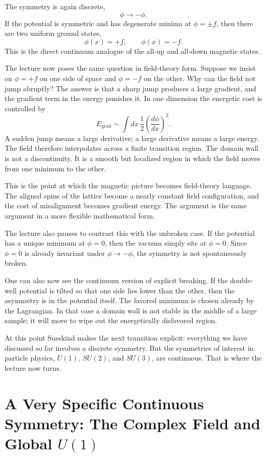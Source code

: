 The symmetry is again discrete,
\[
\phi \longrightarrow -\phi.
\]
If the potential is symmetric and has degenerate minima at \(\phi=\pm f\), then there are two uniform ground states,
\[
\phi(x)=+f,
\qquad
\phi(x)=-f.
\]
This is the direct continuum analogue of the all-up and all-down magnetic states.

The lecture now poses the same question in field-theory form. Suppose we insist on \(\phi=+f\) on one side of space and \(\phi=-f\) on the other. Why can the field not jump abruptly? The answer is that a sharp jump produces a large gradient, and the gradient term in the energy punishes it. In one dimension the energetic cost is controlled by
\begin{equation}
E_{\text{grad}} \sim \int dx\,\frac12\left(\frac{d\phi}{dx}\right)^2.
\label{eq:wall-gradient-energy-refined}
\end{equation}
A sudden jump means a large derivative; a large derivative means a large energy. The field therefore interpolates across a finite transition region. The domain wall is not a discontinuity. It is a smooth but localized region in which the field moves from one minimum to the other.

This is the point at which the magnetic picture becomes field-theory language. The aligned spins of the lattice become a nearly constant field configuration, and the cost of misalignment becomes gradient energy. The argument is the same argument in a more flexible mathematical form.

The lecture also pauses to contrast this with the unbroken case. If the potential has a unique minimum at \(\phi=0\), then the vacuum simply sits at \(\phi=0\). Since \(\phi=0\) is already invariant under \(\phi\to-\phi\), the symmetry is not spontaneously broken.

One can also now see the continuum version of explicit breaking. If the double-well potential is tilted so that one side lies lower than the other, then the asymmetry is in the potential itself. The favored minimum is chosen already by the Lagrangian. In that case a domain wall is not stable in the middle of a large sample; it will move to wipe out the energetically disfavored region.

At this point Susskind makes the next transition explicit: everything we have discussed so far involves a discrete symmetry. But the symmetries of interest in particle physics, \(U(1)\), \(SU(2)\), and \(SU(3)\), are continuous. That is where the lecture now turns.

\section{A Very Specific Continuous Symmetry: The Complex Field and Global \(U(1)\)}

